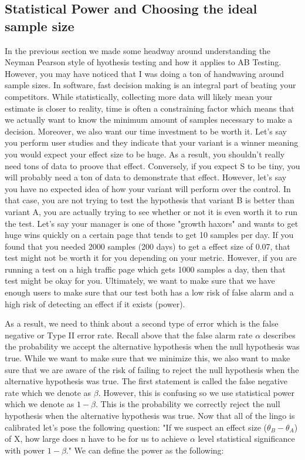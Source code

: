 \subsection{Statistical Power and Choosing the ideal sample size} 

In the previous section we made some headway around understanding the Neyman Pearson style of hyothesis testing and how it applies
to AB Testing. However, you may have noticed that I was doing a ton of handwaving around sample sizes. In software, fast decision 
making is an integral part of beating your competitors. While statistically, collecting more data will likely mean your estimate is
closer to reality, time is often a constraining factor which means that we actually want to know the minimum amount of samples necessary
to make a decision. Moreover, we also want our time investment to be worth it. Let's say you perform user studies and they 
indicate that your variant is a winner meaning you would expect your effect size to be huge. As a result, 
you shouldn't really need tons of data to proove that effect. Conversely, if you expect S to be tiny, you will probably need a ton
of data to demonstrate that effect. However, let's say you have no expected idea of how your variant will perform over the control. In that
case, you are not trying to test the hypothesis that variant B is better than variant A, you are actually trying to see whether or not it is even 
worth it to run the test. Let's say your manager is one of those "growth haxors" and wants to get huge wins quickly on a certain page that tends to get 10 samples
per day. If you found that you needed 2000 samples (200 days) to get a effect size of 0.07, that test might not be worth it for you depending on your metric. 
However, if you are running a test on a high traffic page which gets 1000 samples a day, then that test might be okay for you. Ultimately, we want to make 
sure that we have enough users to make sure that our test both has a low risk of false alarm and a high risk of detecting an effect if it exists (power).

As a result, we need to think about a second type of error which is the false negative
or Type II error rate. Recall above that the false alarm rate $\alpha$ describes the probability we accept the alternative hypothesis when the
null hypothesis was true. While we want to make sure that we minimize this, we also want to make sure that we are aware of the risk of
failing to reject the null hypothesis when the alternative hypothesis was true. The first statement is called the false negative rate which we
denote as $\beta$. However, this is confusing so we use statistical power which we denote as $1-\beta$. This is the probability we correctly reject the null 
hypothesis when the alternative hypothesis was true. Now that all of the lingo is calibrated let's pose the following question: "If we suspect an effect size 
($\theta_B-\theta_A$) of X, how large does n have to be for us to achieve $\alpha$ level statistical significance with power $1-\beta$." 
We can define the power as the following: 


